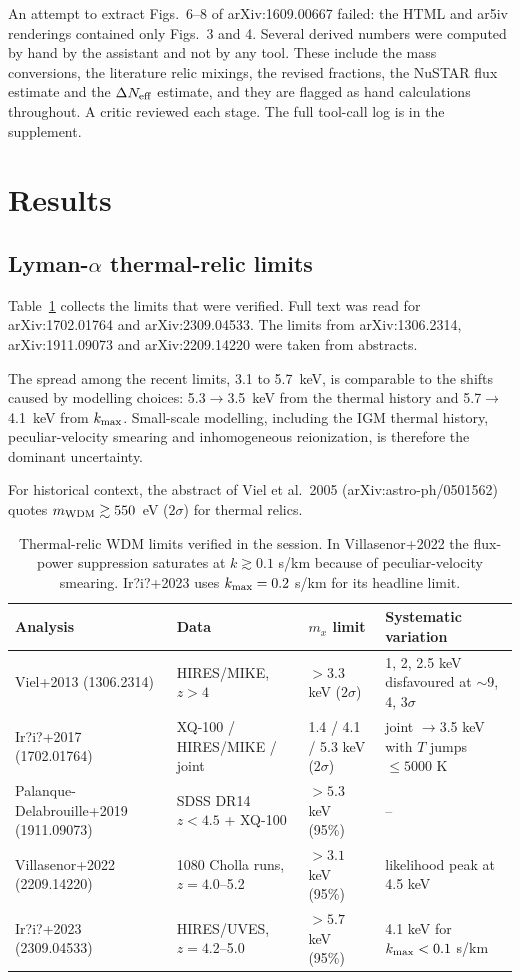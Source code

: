 \documentclass[11pt,a4paper]{article}
\begin{document}
An attempt to extract Figs.~6--8 of arXiv:1609.00667 failed: the HTML and ar5iv renderings contained only Figs.~3 and 4. Several derived numbers were computed by hand by the assistant and not by any tool. These include the mass conversions, the literature relic mixings, the revised fractions, the NuSTAR flux estimate and the $\Delta N_{\rm eff}$ estimate, and they are flagged as hand calculations throughout. A critic reviewed each stage. The full tool-call log is in the supplement.

\section{Results}

\subsection{Lyman-$\alpha$ thermal-relic limits}

Table~\ref{tab:lya} collects the limits that were verified. Full text was read for arXiv:1702.01764 and arXiv:2309.04533. The limits from arXiv:1306.2314, arXiv:1911.09073 and arXiv:2209.14220 were taken from abstracts.

The spread among the recent limits, 3.1 to 5.7~keV, is comparable to the shifts caused by modelling choices: 5.3$\to$3.5~keV from the thermal history and 5.7$\to$4.1~keV from $k_{\rm max}$. Small-scale modelling, including the IGM thermal history, peculiar-velocity smearing and inhomogeneous reionization, is therefore the dominant uncertainty.

For historical context, the abstract of Viel et al.\ 2005 (arXiv:astro-ph/0501562) quotes $m_{\rm WDM}\gtrsim550$~eV ($2\sigma$) for thermal relics.

\begin{table}
\centering
\begin{tabular}{llll}
\toprule
Analysis & Data & $m_x$ limit & Systematic variation \\
\midrule
Viel+2013 (1306.2314) & HIRES/MIKE, $z>4$ & $>3.3$ keV ($2\sigma$) & 1, 2, 2.5 keV disfavoured at $\sim$9, 4, 3$\sigma$ \\
Ir?i?+2017 (1702.01764) & XQ-100 / HIRES/MIKE / joint & 1.4 / 4.1 / 5.3 keV ($2\sigma$) & joint $\to$3.5 keV with $T$ jumps $\le5000$ K \\
Palanque-Delabrouille+2019 (1911.09073) & SDSS DR14 $z<4.5$ + XQ-100 & $>5.3$ keV (95\%) & -- \\
Villasenor+2022 (2209.14220) & 1080 Cholla runs, $z=4.0$--5.2 & $>3.1$ keV (95\%) & likelihood peak at 4.5 keV \\
Ir?i?+2023 (2309.04533) & HIRES/UVES, $z=4.2$--5.0 & $>5.7$ keV (95\%) & 4.1 keV for $k_{\rm max}<0.1$ s/km \\
\bottomrule
\end{tabular}
\caption{Thermal-relic WDM limits verified in the session. In Villasenor+2022 the flux-power suppression saturates at $k\gtrsim0.1$ s/km because of peculiar-velocity smearing. Ir?i?+2023 uses $k_{\rm max}=0.2$ s/km for its headline limit.}
\label{tab:lya}
\end{table}
\end{document}
